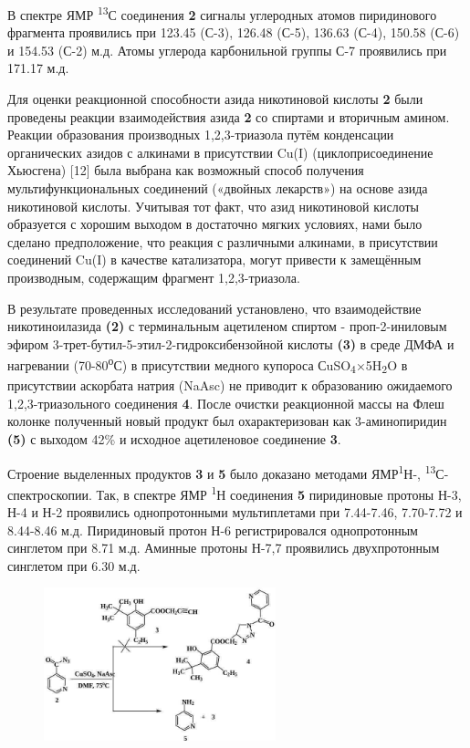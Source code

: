 \begin{multicols}{2}
В спектре ЯМР \textsuperscript{13}С соединения {\bfseries 2} сигналы
углеродных атомов пиридинового фрагмента проявились при 123.45 (С-3),
126.48 (С-5), 136.63 (С-4), 150.58 (С-6) и 154.53 (С-2) м.д. Атомы
углерода карбонильной группы С-7 проявились при 171.17 м.д.

Для оценки реакционной способности азида никотиновой кислоты {\bfseries 2}
были проведены реакции взаимодействия азида {\bfseries 2} со спиртами и
вторичным амином. Реакции образования производных 1,2,3-триазола путём
конденсации органических азидов с алкинами в присутствии Cu(I)
(циклоприсоединение Хьюсгена) {[}12{]} была выбрана как возможный способ
получения мультифункциональных соединений («двойных лекарств») на основе
азида никотиновой кислоты. Учитывая тот факт, что азид никотиновой
кислоты образуется с хорошим выходом в достаточно мягких условиях, нами
было сделано предположение, что реакция с различными алкинами, в
присутствии соединений Cu(I) в качестве катализатора, могут привести к
замещённым производным, содержащим фрагмент 1,2,3-триазола.

В результате проведенных исследований установлено, что взаимодействие
никотиноилазида {\bfseries (2)} с терминальным ацетиленом спиртом -
проп-2-иниловым эфиром 3-трет-бутил-5-этил-2-гидроксибензойной кислоты
{\bfseries (3)} в среде ДМФА и нагревании (70-80\textsuperscript{о}С) в
присутствии медного купороса СuSO\textsubscript{4}×5H\textsubscript{2}O
в присутствии аскорбата натрия (NaAsc) не приводит к образованию
ожидаемого 1,2,3-триазольного соединения {\bfseries 4}. После очистки
реакционной массы на Флеш колонке полученный новый продукт был
охарактеризован как 3-аминопиридин {\bfseries (5)} с выходом 42\% и
исходное ацетиленовое соединение {\bfseries 3}.

Строение выделенных продуктов {\bfseries 3} и {\bfseries 5} было доказано
методами ЯМР\textsuperscript{1}Н-, \textsuperscript{13}С- спектроскопии.
Так, в спектре ЯМР \textsuperscript{1}Н соединения {\bfseries 5}
пиридиновые протоны Н-3, Н-4 и Н-2 проявились однопротонными
мультиплетами при 7.44-7.46, 7.70-7.72 и 8.44-8.46 м.д. Пиридиновый
протон Н-6 регистрировался однопротонным синглетом при 8.71 м.д. Аминные
протоны Н-7,7 проявились двухпротонным синглетом при 6.30 м.д.
\end{multicols}

\begin{figure}[H]
	\centering
	\includegraphics[width=0.6\textwidth]{assets/3}
\end{figure}

